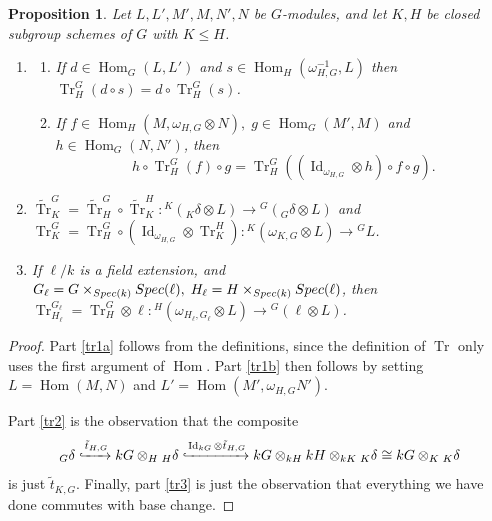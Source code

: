 \documentclass[10pt,a4paper]{amsart}
\newtheorem{proposition}{Proposition}
\DeclareMathOperator{\Hom}{Hom}
\newcommand{\Spec}{{\rm Spec }}
\DeclareMathOperator{\Tr}{Tr}
\DeclareMathOperator{\ide}{Id}
\begin{document}
\begin{proposition}\label{pr:properties-tr}
Let $L,L',M',M,N',N$ be $G$-modules, and let $K,H$ be closed subgroup schemes of $G$ with $K\leq H$.

\begin{enumerate}
\item 
\begin{enumerate}
	\item \label{tr1a}
	If $d \in \Hom_G(L,L')$ and $ s \in \Hom_H(\omega^{-1}_{H,G}, L)$ then $\Tr^G_H (d \circ s) = d \circ \Tr^G_H(s)$.
	\item \label{tr1b}
If $f \in \Hom_H (M,  \omega_{H,G} \otimes N), \; g \in \Hom_G (M',M)$ and $h \in \Hom_G (N,N')$, then 
\[
h \circ \Tr_H^G(f)\circ g = \Tr_H^G( ( \ide_{\omega_{H,G}} \otimes h) \circ f \circ g).
\]
\end{enumerate}

\item \label{tr2} $\tilde{\Tr}^G_K = \tilde{\Tr}^G_H \circ \tilde{\Tr}^H_K \! :  {}^K({}_K \delta  \otimes L) \rightarrow {}^G({}_G \delta  \otimes L)$ and 
$\Tr^G_K = \Tr^G_H \circ (\ide _{\omega_{H,G}} \otimes \Tr^H_K) \! :  {}^K( \omega_{K,G}  \otimes L) \rightarrow {}^GL$. 

\item \label{tr3} If $\ell /k$  is a field extension, and $G_\ell=G\times_{\Spec (k)} \Spec (\ell),\;H_\ell=H\times_{\Spec (k)} \Spec (\ell)$, then $  \Tr_{H_\ell}^{G_\ell} = \Tr_{H}^G \otimes \ell \! : 
{}^H(\omega_{H_\ell,G_\ell} \otimes L) \rightarrow {}^G(\ell \otimes L)$.

\end{enumerate}
\end{proposition}

\begin{proof}
	
	Part \ref{tr1a} follows from the definitions, since the definition of $\Tr$ only uses the first argument of $\Hom$. Part \ref{tr1b} then follows by setting $L= \Hom(M,N)$ and $L'=\Hom(M',\omega_{H,G}N')$.
	
	Part \ref{tr2} is the observation that the composite
	\[ {}_G \delta \xhookrightarrow{\tilde{t}_{H,G}} kG \otimes _H {}_H \delta \xhookrightarrow{\ide_{kG} \otimes \tilde{t}_{H,G}} kG \otimes_{kH}kH \otimes _{kK} {}_K \delta \cong kG \otimes_K {}_K \delta \]
	is just $\tilde{t}_{K,G}$.
	Finally,  part \ref{tr3} is just the observation that everything we have done commutes with base change.
\end{proof}
\end{document}
